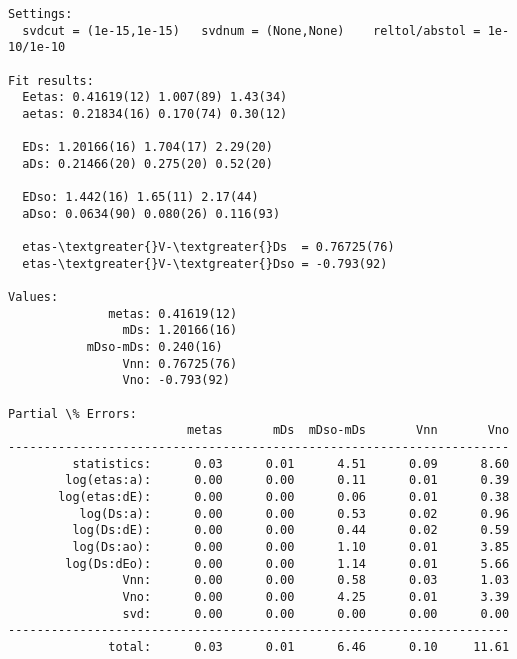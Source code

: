 \documentclass[letterpaper,10pt,english]{sphinxmanual}
\begin{document}
\begin{Verbatim}[commandchars=\\\{\}]
Settings:
  svdcut = (1e-15,1e-15)   svdnum = (None,None)    reltol/abstol = 1e-10/1e-10

Fit results:
  Eetas: 0.41619(12) 1.007(89) 1.43(34)
  aetas: 0.21834(16) 0.170(74) 0.30(12)

  EDs: 1.20166(16) 1.704(17) 2.29(20)
  aDs: 0.21466(20) 0.275(20) 0.52(20)

  EDso: 1.442(16) 1.65(11) 2.17(44)
  aDso: 0.0634(90) 0.080(26) 0.116(93)

  etas-\textgreater{}V-\textgreater{}Ds  = 0.76725(76)
  etas-\textgreater{}V-\textgreater{}Dso = -0.793(92)

Values:
              metas: 0.41619(12)         
                mDs: 1.20166(16)         
           mDso-mDs: 0.240(16)           
                Vnn: 0.76725(76)         
                Vno: -0.793(92)          

Partial \% Errors:
                         metas       mDs  mDso-mDs       Vnn       Vno
----------------------------------------------------------------------
         statistics:      0.03      0.01      4.51      0.09      8.60
        log(etas:a):      0.00      0.00      0.11      0.01      0.39
       log(etas:dE):      0.00      0.00      0.06      0.01      0.38
          log(Ds:a):      0.00      0.00      0.53      0.02      0.96
         log(Ds:dE):      0.00      0.00      0.44      0.02      0.59
         log(Ds:ao):      0.00      0.00      1.10      0.01      3.85
        log(Ds:dEo):      0.00      0.00      1.14      0.01      5.66
                Vnn:      0.00      0.00      0.58      0.03      1.03
                Vno:      0.00      0.00      4.25      0.01      3.39
                svd:      0.00      0.00      0.00      0.00      0.00
----------------------------------------------------------------------
              total:      0.03      0.01      6.46      0.10     11.61
\end{Verbatim}
\end{document}
